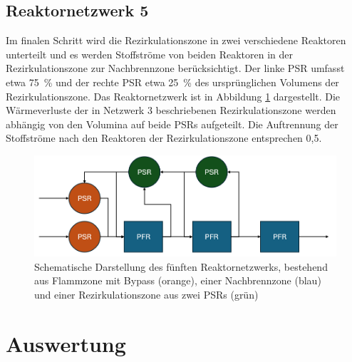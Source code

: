         \subsection*{Reaktornetzwerk 5}
            Im finalen Schritt wird die Rezirkulationszone in zwei verschiedene Reaktoren unterteilt und es werden Stoffströme von beiden Reaktoren in der Rezirkulationszone zur Nachbrennzone berücksichtigt. Der linke PSR umfasst etwa 75~\% und der rechte PSR etwa 25~\% des ursprünglichen Volumens der Rezirkulationszone. Das Reaktornetzwerk ist in Abbildung \ref{fig:reaktornetzwerk5} dargestellt. Die Wärmeverluste der in Netzwerk 3 beschriebenen Rezirkulationszone werden abhängig von den Volumina auf beide PSRs aufgeteilt. Die Auftrennung der Stoffströme nach den Reaktoren der Rezirkulationszone entsprechen 0,5.
            \begin{figure}[H]
                \centering
                \includegraphics[width=0.8\linewidth]{img/Erweiterungen/5.png}
                \caption{Schematische Darstellung des fünften Reaktornetzwerks, bestehend aus Flammzone mit Bypass (orange), einer Nachbrennzone (blau) und einer Rezirkulationszone aus zwei PSRs (grün)}
                \label{fig:reaktornetzwerk5}
            \end{figure}
\iffalse
    \section{Auswertung}

